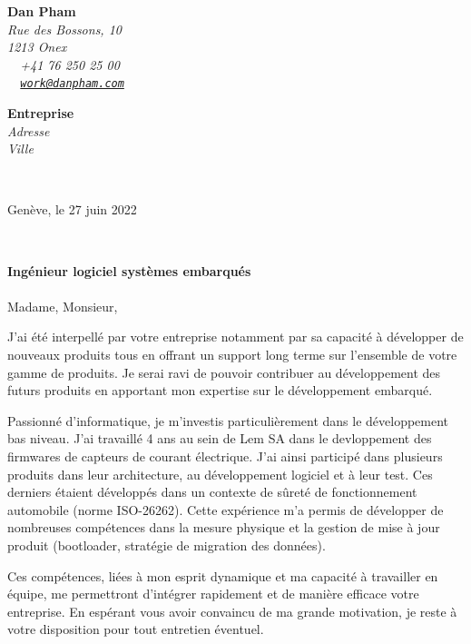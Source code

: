\documentclass[11pt]{article}
\begin{document}
\sffamily   %
\hfill%
\begin{flushleft}
{\bfseries Dan Pham}\\[.35ex]
{\small\itshape
Rue des Bossons, 10\\
1213 Onex\\[.35ex]
~\raisebox{-0.3ex}{\faPhone}~+41 76 250 25 00\\
~\raisebox{-0.1ex}{\faEnvelopeO}~\texttt{\href{mailto:Dan\%20Pham<work@danpham.com>?subject=Contact}{work@danpham.com}}
}\\[3em]

\begin{flushright}

\begin{minipage}[t]{.4\textwidth}
\raggedright
{\bfseries Entreprise}\\[.35ex]
{\small\itshape
Adresse \\
Ville \\}
\end{minipage}\\[2em]

\end{flushright}
\end{flushleft}

\hfill %
\begin{minipage}[t]{.4\textwidth}
        Genève, le 27 juin 2022
\end{minipage}\\[8em]
\raggedright
\textbf{Ingénieur logiciel systèmes embarqués} \\[2em]
\paragraph{}
Madame, Monsieur,
\par
\hspace{0.4cm}J'ai été interpellé par votre entreprise notamment par sa capacité à développer de nouveaux produits tous en offrant un support long terme sur l'ensemble de votre gamme de produits. Je serai ravi de pouvoir contribuer au développement des futurs produits en apportant mon expertise sur le développement embarqué.
\par
\hspace{0.4cm}Passionné d’informatique, je m'investis particulièrement dans le développement bas niveau. J’ai travaillé 4 ans au sein de Lem SA dans le devloppement des firmwares de capteurs de courant électrique. J'ai ainsi participé dans plusieurs produits dans leur architecture, au développement logiciel et à leur test. Ces derniers étaient développés dans un contexte de sûreté de fonctionnement automobile (norme ISO-26262). Cette expérience m'a permis de développer de nombreuses compétences dans la mesure physique et la gestion de mise à jour produit (bootloader, stratégie de migration des données).
\par
\hspace{0.4cm}Ces compétences, liées à mon esprit dynamique et ma capacité à travailler en équipe, me permettront d’intégrer rapidement et de manière efficace votre entreprise. En espérant vous avoir convaincu de ma grande motivation, je reste à votre disposition pour tout entretien éventuel.
\end{document}
